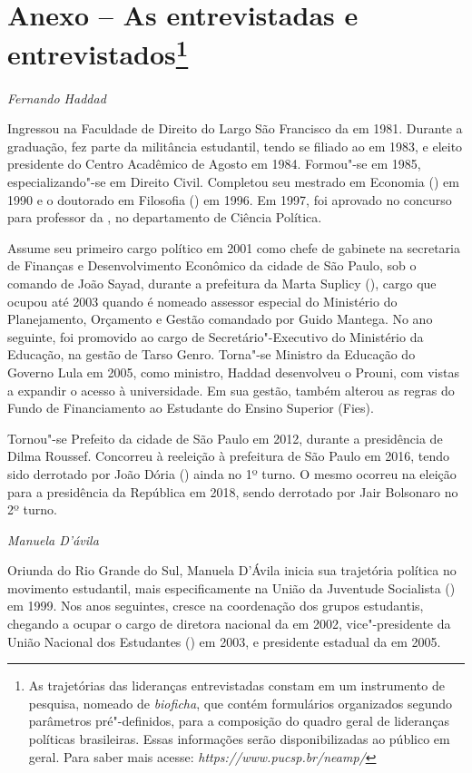 \section{Anexo -- As entrevistadas e entrevistados\footnote{As
  trajetórias das lideranças entrevistadas constam em um instrumento de
  pesquisa, nomeado de \emph{bioficha}, que contém formulários
  organizados segundo parâmetros pré"-definidos, para a composição do
  quadro geral de lideranças políticas brasileiras. Essas informações
  serão disponibilizadas ao público em geral. Para saber mais acesse:
  \emph{https://www.pucsp.br/neamp/}}}

\emph{Fernando Haddad}

Ingressou na Faculdade de Direito do Largo São Francisco da  em 1981.
Durante a graduação, fez parte da militância estudantil, tendo se
filiado ao  em 1983, e eleito presidente do Centro Acadêmico  de
Agosto em 1984. Formou"-se em 1985, especializando"-se em Direito Civil.
Completou seu mestrado em Economia () em 1990 e o doutorado em
Filosofia () em 1996. Em 1997, foi aprovado no concurso para
professor da , no departamento de Ciência Política.

Assume seu primeiro cargo político em 2001 como chefe de gabinete na
secretaria de Finanças e Desenvolvimento Econômico da cidade de São
Paulo, sob o comando de João Sayad, durante a prefeitura da Marta
Suplicy (), cargo que ocupou até 2003 quando é nomeado assessor
especial do Ministério do Planejamento, Orçamento e Gestão comandado por
Guido Mantega. No ano seguinte, foi promovido ao cargo de
Secretário"-Executivo do Ministério da Educação, na gestão de Tarso
Genro. Torna"-se Ministro da Educação do Governo Lula em 2005, como
ministro, Haddad desenvolveu o Prouni, com vistas a expandir o acesso à
universidade. Em sua gestão, também alterou as regras do Fundo de
Financiamento ao Estudante do Ensino Superior (Fies).

Tornou"-se Prefeito da cidade de São Paulo em 2012, durante a presidência
de Dilma Roussef. Concorreu à reeleição à prefeitura de São Paulo em
2016, tendo sido derrotado por João Dória () ainda no 1º turno. O
mesmo ocorreu na eleição para a presidência da República em 2018, sendo
derrotado por Jair Bolsonaro no 2º turno.

\emph{Manuela D'ávila}

Oriunda do Rio Grande do Sul, Manuela D'Ávila inicia sua trajetória
política no movimento estudantil, mais especificamente na União da
Juventude Socialista () em 1999. Nos anos seguintes, cresce na
coordenação dos grupos estudantis, chegando a ocupar o cargo de diretora
nacional da  em 2002, vice"-presidente da União Nacional dos
Estudantes () em 2003, e presidente estadual da  em 2005.

